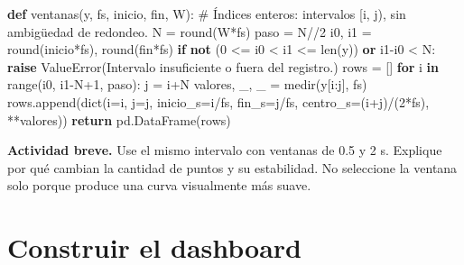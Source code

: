 \documentclass[
  spanish,
  10.5pt,
  a4paper,
  DIV=11,
  numbers=noendperiod]{scrartcl}
\newenvironment{Shaded}{\begin{snugshade}}{\end{snugshade}}
\newcommand{\BuiltInTok}[1]{\textcolor[rgb]{0.00,0.23,0.31}{#1}}
\newcommand{\CommentTok}[1]{\textcolor[rgb]{0.37,0.37,0.37}{#1}}
\newcommand{\ControlFlowTok}[1]{\textcolor[rgb]{0.00,0.23,0.31}{\textbf{#1}}}
\newcommand{\DecValTok}[1]{\textcolor[rgb]{0.68,0.00,0.00}{#1}}
\newcommand{\KeywordTok}[1]{\textcolor[rgb]{0.00,0.23,0.31}{\textbf{#1}}}
\newcommand{\NormalTok}[1]{\textcolor[rgb]{0.00,0.23,0.31}{#1}}
\newcommand{\OperatorTok}[1]{\textcolor[rgb]{0.37,0.37,0.37}{#1}}
\newcommand{\PreprocessorTok}[1]{\textcolor[rgb]{0.68,0.00,0.00}{#1}}
\newcommand{\StringTok}[1]{\textcolor[rgb]{0.13,0.47,0.30}{#1}}
\begin{document}
\begin{Shaded}
\begin{Highlighting}[]
\KeywordTok{def}\NormalTok{ ventanas(y, fs, inicio, fin, W):}
    \CommentTok{\# Índices enteros: intervalos [i, j), sin ambigüedad de redondeo.}
\NormalTok{    N }\OperatorTok{=} \BuiltInTok{round}\NormalTok{(W}\OperatorTok{*}\NormalTok{fs)}
\NormalTok{    paso }\OperatorTok{=}\NormalTok{ N}\OperatorTok{//}\DecValTok{2}
\NormalTok{    i0, i1 }\OperatorTok{=} \BuiltInTok{round}\NormalTok{(inicio}\OperatorTok{*}\NormalTok{fs), }\BuiltInTok{round}\NormalTok{(fin}\OperatorTok{*}\NormalTok{fs)}
    \ControlFlowTok{if} \KeywordTok{not}\NormalTok{ (}\DecValTok{0} \OperatorTok{\textless{}=}\NormalTok{ i0 }\OperatorTok{\textless{}}\NormalTok{ i1 }\OperatorTok{\textless{}=} \BuiltInTok{len}\NormalTok{(y)) }\KeywordTok{or}\NormalTok{ i1}\OperatorTok{{-}}\NormalTok{i0 }\OperatorTok{\textless{}}\NormalTok{ N:}
        \ControlFlowTok{raise} \PreprocessorTok{ValueError}\NormalTok{(}\StringTok{\textquotesingle{}Intervalo insuficiente o fuera del registro.\textquotesingle{}}\NormalTok{)}
\NormalTok{    rows }\OperatorTok{=}\NormalTok{ []}
    \ControlFlowTok{for}\NormalTok{ i }\KeywordTok{in} \BuiltInTok{range}\NormalTok{(i0, i1}\OperatorTok{{-}}\NormalTok{N}\OperatorTok{+}\DecValTok{1}\NormalTok{, paso):}
\NormalTok{        j }\OperatorTok{=}\NormalTok{ i}\OperatorTok{+}\NormalTok{N}
\NormalTok{        valores, \_, \_ }\OperatorTok{=}\NormalTok{ medir(y[i:j], fs)}
\NormalTok{        rows.append(}\BuiltInTok{dict}\NormalTok{(i}\OperatorTok{=}\NormalTok{i, j}\OperatorTok{=}\NormalTok{j, inicio\_s}\OperatorTok{=}\NormalTok{i}\OperatorTok{/}\NormalTok{fs, fin\_s}\OperatorTok{=}\NormalTok{j}\OperatorTok{/}\NormalTok{fs,}
\NormalTok{                         centro\_s}\OperatorTok{=}\NormalTok{(i}\OperatorTok{+}\NormalTok{j)}\OperatorTok{/}\NormalTok{(}\DecValTok{2}\OperatorTok{*}\NormalTok{fs), }\OperatorTok{**}\NormalTok{valores))}
    \ControlFlowTok{return}\NormalTok{ pd.DataFrame(rows)}
\end{Highlighting}
\end{Shaded}

\textbf{Actividad breve.} Use el mismo intervalo con ventanas de 0.5 y 2
s. Explique por qué cambian la cantidad de puntos y su estabilidad. No
seleccione la ventana solo porque produce una curva visualmente más
suave.

\section{Construir el dashboard}\label{construir-el-dashboard}
\end{document}
